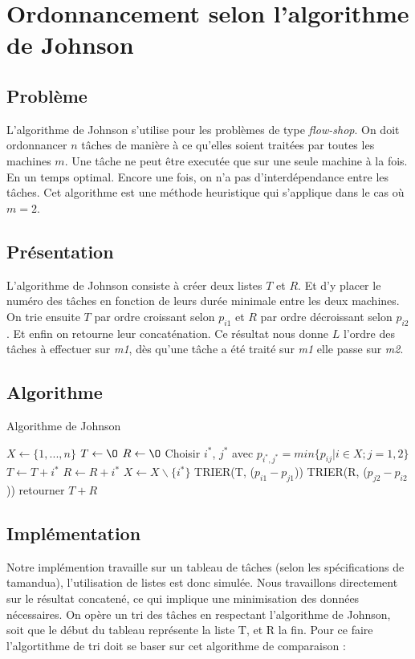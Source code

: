 \section{Ordonnancement selon l'algorithme de Johnson}
\subsection{Problème}
L'algorithme de Johnson s'utilise pour les problèmes de type {\em flow-shop}.
On doit ordonnancer $n$ tâches de manière à ce qu'elles soient traitées par
toutes les machines $m$.
Une tâche ne peut être executée que sur une seule machine à la
fois. En un temps optimal. Encore une fois, on n'a pas d'interdépendance entre
les tâches. Cet algorithme est une méthode heuristique qui s'applique 
dans le cas où $m=2$.

\subsection{Présentation}
L'algorithme de Johnson consiste à créer deux listes $T$ et $R$. Et d'y placer 
le numéro des tâches en fonction de leurs durée minimale entre les deux 
machines. On trie ensuite $T$ par ordre croissant selon $p_{i1}$ et $R$ par
ordre décroissant selon $p_{i2}$. Et enfin on retourne leur concaténation.
Ce résultat nous donne $L$ l'ordre des tâches à effectuer sur {\em m1},
dès qu'une tâche a été traité sur {\em m1} elle passe sur {\em m2}.

\subsection{Algorithme}
\begin{algorithm}
\caption{Algorithme de Johnson}
\begin{algorithmic}
\STATE $X \leftarrow \{1,...,n\}$
\STATE $T \leftarrow \O$
\STATE $R \leftarrow \O$
	\STATE Choisir $i^*$, $j^*$ avec $p_{i^*,j^*} = min\{p_{ij}|i \in X; j = 1,2\}$
		\STATE $T \leftarrow T + i^*$
	\ELSE
		\STATE $R \leftarrow R + i^*$
	\ENDIF
	\STATE $X \leftarrow X\backslash\{i^*\}$
\ENDWHILE
\STATE TRIER(T, ($p_{i1} - p_{j1}$))
\STATE TRIER(R, ($p_{j2} - p_{i2}$))
\STATE retourner $T + R$
\end{algorithmic}
\end{algorithm}

\subsection{Implémentation}
Notre implémention travaille sur un tableau de tâches (selon les spécifications de
tamandua), l'utilisation de listes est donc simulée.
Nous travaillons directement sur le résultat concatené, ce qui implique une
minimisation des données nécessaires. On opère un tri des tâches en respectant
l'algorithme de Johnson, soit que le début du tableau représente la liste T,
et R la fin. Pour ce faire l'algortithme de tri doit se baser sur cet algorithme
de comparaison :


